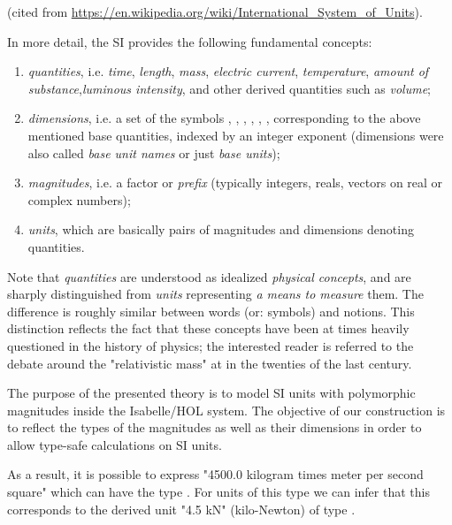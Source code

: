 \documentclass[11pt,a4paper]{book}
\begin{document}
(cited from \url{https://en.wikipedia.org/wiki/International_System_of_Units}).

In more detail, the SI provides the following fundamental concepts:

%
\begin{enumerate}%
\item \emph{quantities}, i.e. \emph{time}, \emph{length}, \emph{mass}, \emph{electric current},
\emph{temperature}, \emph{amount of substance},\emph{luminous intensity},
and other derived quantities such as \emph{volume};

\item \emph{dimensions}, i.e. a set of the symbols  , , , ,  \isa{{\isasymTheta}}, ,   corresponding
to the above mentioned base quantities,  indexed by an integer exponent
(dimensions were also called \emph{base unit names} or just \emph{base units});

\item \emph{magnitudes}, i.e. a factor or \emph{prefix}
(typically integers, reals, vectors on real or complex numbers);

\item \emph{units}, which are basically pairs of magnitudes and dimensions denoting quantities.
\end{enumerate}

Note that \emph{quantities} are understood as idealized  \emph{physical concepts}, and are sharply 
distinguished from  \emph{units} representing \emph{a means to measure} them. The difference is 
roughly similar between words (or: symbols) and notions. This distinction reflects the fact that
these concepts have been at times heavily questioned in the history of physics; the interested
reader is referred to the debate around the "relativistic mass" at in the twenties of the last century.

The purpose of the presented theory is to model SI units with polymorphic magnitudes inside the
Isabelle/HOL\cite{nipkow.ea:isabelle:2002} system. The objective of our construction is to
reflect the types of the magnitudes as well as their dimensions in order to allow type-safe 
calculations on SI units.

As a result, it is possible to express "4500.0 kilogram times meter per second square" which can
have the type 
. 
For units of this type we can infer that this corresponds to the derived unit "4.5 kN" (kilo-Newton) 
 of type .  
\end{document}
